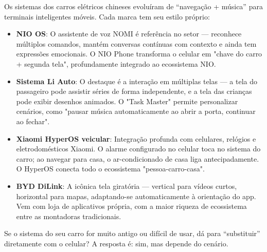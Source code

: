 
Os sistemas dos carros elétricos chineses evoluíram de “navegação + música” para terminais inteligentes móveis. Cada marca tem seu estilo próprio:

\begin{itemize}
  \item \textbf{NIO OS}: O assistente de voz NOMI é referência no setor — reconhece múltiplos comandos, mantém conversas contínuas com contexto e ainda tem expressões emocionais. O NIO Phone transforma o celular em "chave do carro + segunda tela", profundamente integrado ao ecossistema NIO.
  \item \textbf{Sistema Li Auto}: O destaque é a interação em múltiplas telas — a tela do passageiro pode assistir séries de forma independente, e a tela das crianças pode exibir desenhos animados. O "Task Master" permite personalizar cenários, como "pausar música automaticamente ao abrir a porta, continuar ao fechar".
  \item \textbf{Xiaomi HyperOS veicular}: Integração profunda com celulares, relógios e eletrodomésticos Xiaomi. O alarme configurado no celular toca no sistema do carro; ao navegar para casa, o ar-condicionado de casa liga antecipadamente. O HyperOS conecta todo o ecossistema "pessoa-carro-casa".
  \item \textbf{BYD DiLink}: A icônica tela giratória — vertical para vídeos curtos, horizontal para mapas, adaptando-se automaticamente à orientação do app. Vem com loja de aplicativos própria, com a maior riqueza de ecossistema entre as montadoras tradicionais.
\end{itemize}


Se o sistema do seu carro for muito antigo ou difícil de usar, dá para “substituir” diretamente com o celular? A resposta é: sim, mas depende do cenário.

